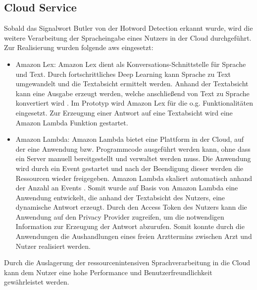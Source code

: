 \subsection{Cloud Service}
Sobald das Signalwort \glqq Butler\grqq{} von der Hotword Detection erkannt wurde, wird die weitere Verarbeitung der Spracheingabe eines Nutzers in der Cloud durchgeführt. Zur Realisierung wurden folgende \ac{aws} eingesetzt:

\begin{itemize}
    \item Amazon Lex: Amazon Lex dient als Konversations-Schnittstelle für Sprache und Text. Durch fortschrittliches Deep Learning kann Sprache zu Text umgewandelt und die Textabsicht ermittelt werden. Anhand der Textabsicht kann eine Ausgabe erzeugt werden, welche anschließend von Text zu Sprache konvertiert wird \cite{AmazonLex}. Im Prototyp wird Amazon Lex für die o.g. Funktionalitäten eingesetzt. Zur Erzeugung einer Antwort auf eine Textabsicht wird eine Amazon Lambda Funktion gestartet.
    \item Amazon Lambda: Amazon Lambda bietet eine Plattform in der Cloud, auf der eine Anwendung bzw. Programmcode ausgeführt werden kann, ohne dass ein Server manuell bereitgestellt und verwaltet werden muss. Die Anwendung wird durch ein Event gestartet und nach der Beendigung dieser werden die Ressourcen wieder freigegeben. Amazon Lambda skaliert automatisch anhand der Anzahl an Events \cite{AmazonLambda}. Somit wurde auf Basis von Amazon Lambda eine Anwendung entwickelt, die anhand der Textabsicht des Nutzers, eine dynamische Antwort erzeugt. Durch den Access Token des Nutzers kann die Anwendung auf den Privacy Provider zugreifen, um die notwendigen Information zur Erzeugung der Antwort abzurufen. Somit konnte durch die Anwendungen die Aushandlungen eines freien Arzttermins zwischen Arzt und Nutzer realisiert werden.
\end{itemize}

Durch die Auslagerung der ressourcenintensiven Sprachverarbeitung in die Cloud kann dem Nutzer eine hohe Performance und Benutzerfreundlichkeit gewährleistet werden.